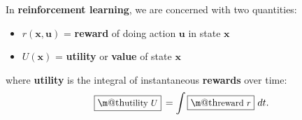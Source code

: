 \documentclass[orivec]{llncs}
\makeatletter
\newcommand{\emp}[1]{\textbf{#1}}
\newcommand{\vect}[1]{\boldsymbol{#1}}
\renewcommand{\boxed}[1]{\fbox{\m@th$\displaystyle\scalebox{0.9}{#1}$} \,}
\makeatother
\begin{document}

In \emp{reinforcement learning}, we are concerned with two quantities:
\begin{itemize}
	\item $r(\vect{x}, \vect{u})$ = \emp{reward} of doing action $\vect{u}$ in state $\vect{x}$
	\item $U(\vect{x})$ = \emp{utility} or \emp{value} of state $\vect{x}$ 
\end{itemize}
where \textbf{utility} is the integral of instantaneous \textbf{rewards} over time:
\begin{equation}
\boxed{\mbox{utility} $U$} = \int \boxed{\mbox{reward} $r$} \,dt .
\end{equation}




\end{document}
